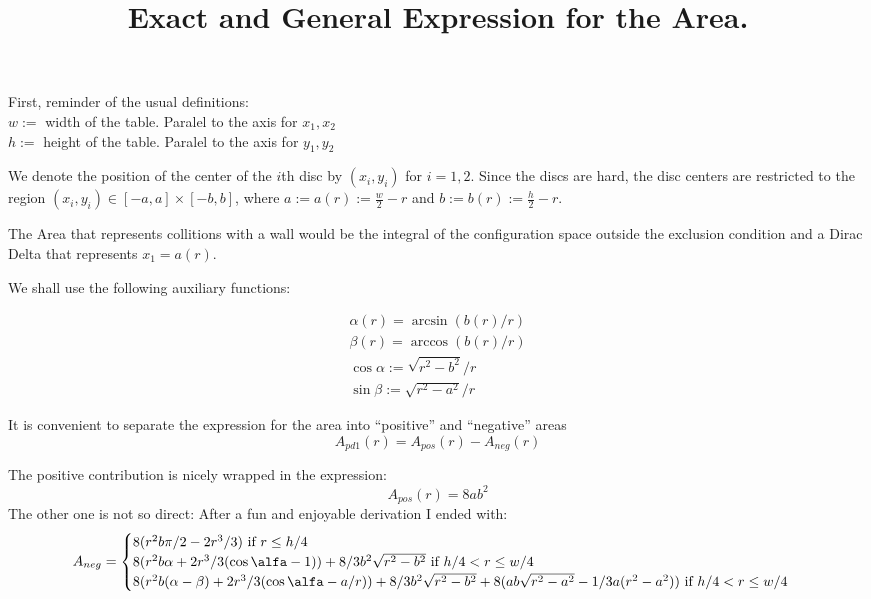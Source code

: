 \documentclass[superscriptaddress,preprint,showpacs, single-column]{revtex4-1}
\newcommand{\defeq}{:=}
\begin{document}
\title{Exact and General Expression for the Area.}

First, reminder of the usual definitions:\\
$w:=$ width of the table. Paralel to the axis for $x_1,x_2$ \\
$h:=$ height of the table. Paralel to the axis for $y_1,y_2$ 

We denote the position of the center of the $i$th disc by 
$(x_{i}, y_{i})$ for $i=1,2$. Since the discs are hard, 
the disc centers are restricted to the region 
$(x_i, y_i) \in [-a,a] \times [-b, b]$, where 
$a \defeq a(r) \defeq \frac{w}{2} - r $ and
$b \defeq b(r) \defeq \frac{h}{2} - r $.

The Area that represents collitions with a wall would be the
integral of the configuration space outside the exclusion condition
and a Dirac Delta that represents $x_1=a(r)$.

We shall use the following auxiliary functions:

\begin{align}
  \alpha(r)=\arcsin(b(r)/r) \\
  \beta(r)=\arccos(b(r)/r) \\
  \cos \alpha := \sqrt{r^2-b^2}/r \\
  \sin \beta := \sqrt{r^2-a^2}/r
\end{align}



It is convenient to separate the expression for the area into
``positive'' and ``negative'' areas
\begin{equation}
A_{pd1}(r)=A_{pos}(r)-A_{neg}(r)
\end{equation}

The positive contribution is nicely wrapped in the expression:
\begin{equation}
  A_{pos}(r)=8ab^2
\end{equation}
The other one is not so direct:
After a fun and enjoyable derivation I ended with:
\begin{equation}
  A_{neg}=\begin{cases}
  8(r^2b \pi/2 -2r^3/3) \text{ if } r \le h/4 \\
  8(r^2b \alpha +2r^3/3 (\cos\alfa -1))+8/3b^2\sqrt{r^2-b^2}
  \text{ if }  h/4 < r \leq w/4 \\
  8(r^2b (\alpha-\beta) +2r^3/3 (\cos\alfa -a/r))+8/3b^2\sqrt{r^2-b^2}
  +8(ab\sqrt{r^2-a^2}-1/3 a(r^2-a^2))
  \text{ if }  h/4 < r \leq w/4 \\
  \end{cases}
\end{equation}
\end{document}
